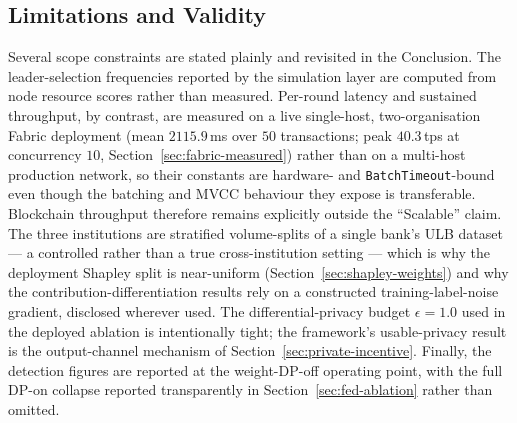 \subsection{Limitations and Validity}
\label{sec:validity}

Several scope constraints are stated plainly and revisited in the Conclusion. The leader-selection frequencies reported by the simulation layer are computed from node resource scores rather than measured. Per-round latency and sustained throughput, by contrast, are measured on a live single-host, two-organisation Fabric deployment (mean $2115.9$\,ms over $50$ transactions; peak $40.3$\,tps at concurrency $10$, Section~\ref{sec:fabric-measured}) rather than on a multi-host production network, so their constants are hardware- and \texttt{BatchTimeout}-bound even though the batching and MVCC behaviour they expose is transferable. Blockchain throughput therefore remains explicitly outside the ``Scalable'' claim. The three institutions are stratified volume-splits of a single bank's ULB dataset --- a controlled rather than a true cross-institution setting --- which is why the deployment Shapley split is near-uniform (Section~\ref{sec:shapley-weights}) and why the contribution-differentiation results rely on a constructed training-label-noise gradient, disclosed wherever used. The differential-privacy budget $\epsilon=1.0$ used in the deployed ablation is intentionally tight; the framework's usable-privacy result is the output-channel mechanism of Section~\ref{sec:private-incentive}. Finally, the detection figures are reported at the weight-DP-off operating point, with the full DP-on collapse reported transparently in Section~\ref{sec:fed-ablation} rather than omitted.
